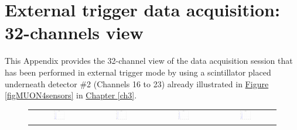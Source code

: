 \chapter[External trigger data acquisition: 32-channels view]{External trigger data acquisition: 32-channels view} \label{appendix32CHmuons}

This Appendix provides the 32-channel view of the data acquisition session that has been performed in external trigger mode by using a scintillator placed underneath detector \#2 (Channels 16 to 23) already illustrated in \hyperref[figMUON4sensors]{Figure \ref{figMUON4sensors}} in \hyperref[ch3]{Chapter \ref{ch3}}.

\begin{figure}[hbt!]
    \centering
    \begin{tabular}{cccc}
        \includegraphics[width=0.204\textwidth]{Images/chap3/results/muons/ch_ext_trigger/incoming_energy_32channels_34_2hr_0.pdf} & \includegraphics[width=0.204\textwidth]{Images/chap3/results/muons/ch_ext_trigger/incoming_energy_32channels_34_2hr_1.pdf} & \includegraphics[width=0.204\textwidth]{Images/chap3/results/muons/ch_ext_trigger/incoming_energy_32channels_34_2hr_2.pdf} & \includegraphics[width=0.204\textwidth]{Images/chap3/results/muons/ch_ext_trigger/incoming_energy_32channels_34_2hr_3.pdf}\\

\end{tabular}
\end{figure}
